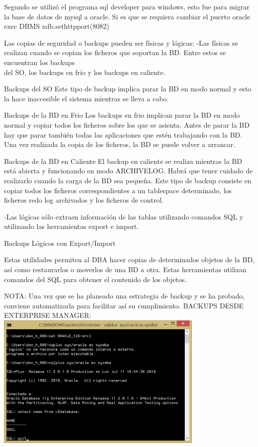 \documentclass[12pt,letterpaper]{article}
\begin{document}
Segundo se utilizó el programa sql developer para windows, esto fue para migrar la base de datos de mysql a oracle.
Si es que se requiera cambiar el puerto  oracle exec DBMS xdb.sethttpport(8082)

Las copias de seguridad o backups pueden ser físicas y lógicas:
-Las físicas se realizan cuando se copian los ficheros que soportan la BD. Entre estos se encuentran los backups\\
del SO, los backups en frío y los backups en caliente.

Backups del SO
Este tipo de backup implica parar la BD en modo normal y esto la hace inaccesible el sistema mientras se lleva a cabo.

Backups de la BD en Frio
Los backups en frio implican parar la BD en modo normal y copiar todos los ficheros sobre los que se asienta. Antes de parar la BD hay que parar también todas las aplicaciones que estén trabajando con la BD. Una vez realizada la copia de los ficheros, la BD se puede volver a arrancar.

Backups de la BD en Caliente
El backup en caliente se realiza mientras la BD está abierta y funcionando en modo ARCHIVELOG. Habrá que tener cuidado de realizarlo cuando la carga de la BD sea pequeña. Este tipo de backup consiste en copiar todos los ficheros correspondientes a un tablespace determinado, los ficheros redo log archivados y los ficheros de control.


-Las lógicas sólo extraen información de las tablas utilizando comandos SQL y utilizando las herramientas export e import.

Backups Lógicos con Export/Import

Estas utilidades permiten al DBA hacer copias de determinados objetos de la BD, así como restaurarlos o moverlos de una BD a otra. Estas herramientas utilizan comandos del SQL para obtener el contenido de los objetos.

NOTA: Una vez que se ha planeado una estrategia de backup y se ha probado, conviene automatizarla para facilitar así su cumplimiento.
\newpage
BACKUPS  DESDE  ENTERPRISE  MANAGER:\\

\includegraphics[width=10cm]{./imagen/imagen-1}
\end{document}
